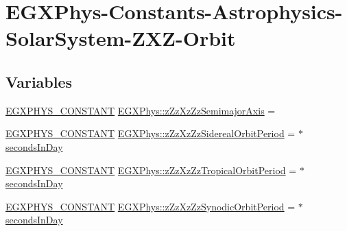 \hypertarget{group___e_g_x_phys-_constants-_astrophysics-_solar_system-_z_x_z-_orbit}{}\section{E\+G\+X\+Phys-\/\+Constants-\/\+Astrophysics-\/\+Solar\+System-\/\+Z\+X\+Z-\/\+Orbit}
\label{group___e_g_x_phys-_constants-_astrophysics-_solar_system-_z_x_z-_orbit}
\subsection*{Variables}
\begin{DoxyCompactItemize}
\item 
\mbox{\hyperlink{group___e_g_x_phys-_constants-_macros_ga76980d288494ce1714c9ac68a95ba702}{E\+G\+X\+P\+H\+Y\+S\+\_\+\+C\+O\+N\+S\+T\+A\+NT}} \mbox{\hyperlink{group___e_g_x_phys-_constants-_astrophysics-_solar_system-_z_x_z-_orbit_ga2992d483d551b1b6f226187deac8e2b9}{E\+G\+X\+Phys\+::z\+Zz\+Xz\+Zz\+Semimajor\+Axis}} =
\item 
\mbox{\hyperlink{group___e_g_x_phys-_constants-_macros_ga76980d288494ce1714c9ac68a95ba702}{E\+G\+X\+P\+H\+Y\+S\+\_\+\+C\+O\+N\+S\+T\+A\+NT}} \mbox{\hyperlink{group___e_g_x_phys-_constants-_astrophysics-_solar_system-_z_x_z-_orbit_ga00bc8df59581966b8ae3ee688a792d6c}{E\+G\+X\+Phys\+::z\+Zz\+Xz\+Zz\+Sidereal\+Orbit\+Period}} = $\ast$\mbox{\hyperlink{namespace_e_g_x_phys_a93d2a00d75411b58cbf63ab3fd1f8bc2}{seconds\+In\+Day}}
\item 
\mbox{\hyperlink{group___e_g_x_phys-_constants-_macros_ga76980d288494ce1714c9ac68a95ba702}{E\+G\+X\+P\+H\+Y\+S\+\_\+\+C\+O\+N\+S\+T\+A\+NT}} \mbox{\hyperlink{group___e_g_x_phys-_constants-_astrophysics-_solar_system-_z_x_z-_orbit_gac25d271142f048dfbbfbfe6e2a2f5e00}{E\+G\+X\+Phys\+::z\+Zz\+Xz\+Zz\+Tropical\+Orbit\+Period}} = $\ast$\mbox{\hyperlink{namespace_e_g_x_phys_a93d2a00d75411b58cbf63ab3fd1f8bc2}{seconds\+In\+Day}}
\item 
\mbox{\hyperlink{group___e_g_x_phys-_constants-_macros_ga76980d288494ce1714c9ac68a95ba702}{E\+G\+X\+P\+H\+Y\+S\+\_\+\+C\+O\+N\+S\+T\+A\+NT}} \mbox{\hyperlink{group___e_g_x_phys-_constants-_astrophysics-_solar_system-_z_x_z-_orbit_gaad51d05c8898a3d937df8d8b274f0b36}{E\+G\+X\+Phys\+::z\+Zz\+Xz\+Zz\+Synodic\+Orbit\+Period}} = $\ast$\mbox{\hyperlink{namespace_e_g_x_phys_a93d2a00d75411b58cbf63ab3fd1f8bc2}{seconds\+In\+Day}}

\end{DoxyCompactItemize}

